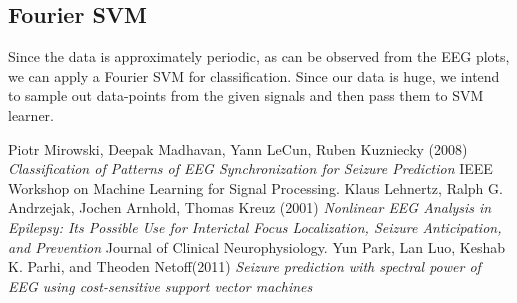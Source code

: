 \documentclass[a4paper]{article}
\begin{document}
\subsection{Fourier SVM}
Since the data is approximately periodic, as can be observed from the EEG plots, we can apply a Fourier SVM for classification. Since our data is huge, we intend to sample out data-points from the given signals and then pass them to SVM learner.

\begin{thebibliography}{99}
 Piotr Mirowski, Deepak Madhavan, Yann LeCun, Ruben Kuzniecky (2008) \textit{Classification of Patterns of EEG Synchronization for Seizure Prediction} IEEE Workshop on Machine Learning for Signal Processing.
 Klaus Lehnertz, Ralph G. Andrzejak, Jochen Arnhold, Thomas Kreuz (2001) \textit{Nonlinear EEG Analysis in Epilepsy: Its Possible Use for Interictal Focus Localization, Seizure Anticipation, and Prevention} Journal of Clinical Neurophysiology.
 Yun Park, Lan Luo, Keshab K. Parhi, and Theoden Netoff(2011) \textit{Seizure prediction with spectral power of EEG using cost-sensitive support vector machines}

\end{thebibliography}
\end{document}
